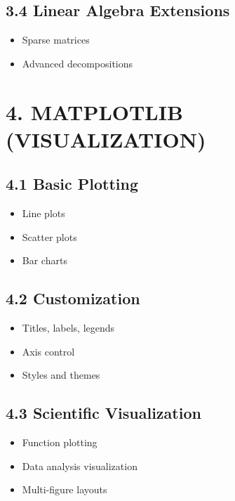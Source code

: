 \subsection*{3.4 Linear Algebra Extensions}

\begin{itemize}
\item Sparse matrices
\item Advanced decompositions
\end{itemize}

\vspace{0.5cm}

\section*{4. MATPLOTLIB (VISUALIZATION)}

\subsection*{4.1 Basic Plotting}

\begin{itemize}
\item Line plots
\item Scatter plots
\item Bar charts
\end{itemize}

\subsection*{4.2 Customization}

\begin{itemize}
\item Titles, labels, legends
\item Axis control
\item Styles and themes
\end{itemize}

\subsection*{4.3 Scientific Visualization}

\begin{itemize}
\item Function plotting
\item Data analysis visualization
\item Multi-figure layouts
\end{itemize}

